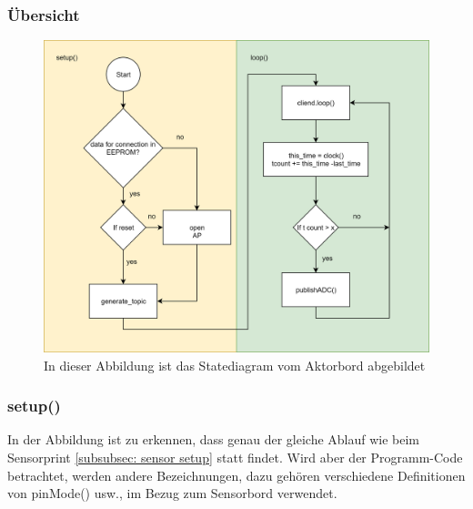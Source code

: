\subsubsection{	Übersicht} 
\begin{figure}[H]
	\centering
	\includegraphics[width=\textwidth]{graphics/StatemaschineAktor.png}
	\caption{In dieser Abbildung ist das Statediagram vom Aktorbord abgebildet}
	\label{pic: statemaschine Aktor}
\end{figure} 
\newpage

\subsubsection{setup()}
In der Abbildung ist zu erkennen, dass genau der gleiche Ablauf wie beim Sensorprint \ref{subsubsec: sensor setup} statt findet. Wird aber der Programm-Code betrachtet, werden andere Bezeichnungen, dazu gehören verschiedene Definitionen von pinMode() usw., im Bezug zum Sensorbord verwendet. 
